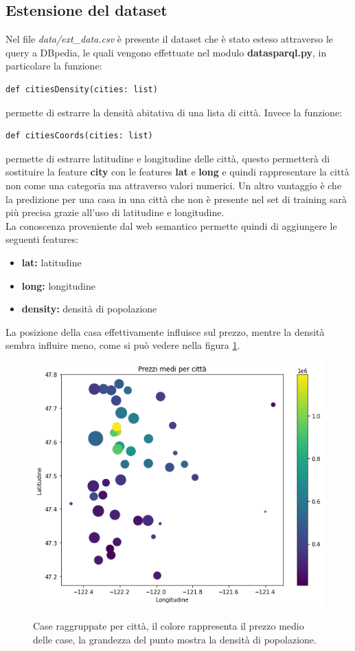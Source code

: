 \documentclass{article}
\begin{document}
\subsection{Estensione del dataset}
Nel file \textit{data/ext\_data.csv} è presente il dataset che è stato esteso
attraverso le query a DBpedia, le quali vengono effettuate nel modulo
\textbf{datasparql.py}, in particolare la funzione:
\begin{verbatim}
def citiesDensity(cities: list)
\end{verbatim}
permette di estrarre la densità abitativa di una lista di città. Invece la
funzione:
\begin{verbatim}
def citiesCoords(cities: list)
\end{verbatim}
permette di estrarre latitudine e longitudine delle città, questo permetterà di
sostituire la feature \textbf{city} con le features \textbf{lat} e
\textbf{long} e quindi rappresentare la città non come una categoria ma
attraverso valori numerici. Un altro vantaggio è che la predizione per una casa
in una città che non è presente nel set di training sarà più precisa grazie
all'uso di latitudine e longitudine. \\
La conoscenza proveniente dal web semantico permette quindi di aggiungere le
seguenti features:
\begin{itemize}
	\itemsep0em
	\item \textbf{lat:} latitudine
	\item \textbf{long:} longitudine
	\item \textbf{density:} densità di popolazione
\end{itemize}
La posizione della casa effettivamente influisce sul prezzo, mentre la densità
sembra influire meno, come si può vedere nella figura \ref{fig:cities}.
\begin{figure}[ht]
	\centering
	\includegraphics[scale=0.4]{cities}
	\label{fig:cities}
	\caption{Case raggruppate per città, il colore rappresenta il prezzo
	medio delle case, la grandezza del punto mostra la densità di popolazione.}
\end{figure}
\end{document}

